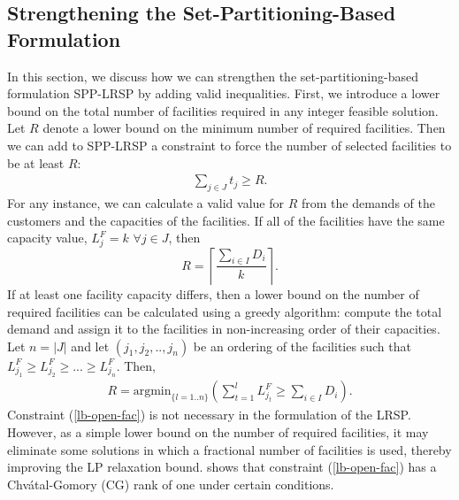 \documentclass[11pt]{article}
\begin{document}
\subsection{Strengthening the Set-Partitioning-Based Formulation}
\label{sec:StrongForm}
In this section, we discuss how we can strengthen the set-partitioning-based formulation
SPP-LRSP by adding valid inequalities. First, we introduce a lower bound on the total 
number of facilities required in any integer feasible solution.  Let $R$ denote a lower bound
on the minimum number of required facilities. 
Then we can add to SPP-LRSP a constraint to force the number of selected
facilities to be at least $R$:
\begin{eqnarray}
\sum_{j \in J} t_{j} \geq R. \label{lb-open-fac}
\end{eqnarray}
For any instance, we can calculate a valid value for $R$ from the demands of the customers and
the capacities of the facilities.  If all of the facilities have the same capacity value,
$L^F_j = k$ $\forall j \in J$, then 
\begin{equation}
R =\left \lceil \frac{\sum_{i \in I} D_i}{k} \right \rceil . \nonumber
\end{equation}
If at least one facility capacity differs, then a lower bound on the number of required
facilities can be calculated using a greedy algorithm: compute the total demand and assign
it to the facilities in non-increasing order of their capacities.  Let $n = |J|$ and 
let $(j_1,j_2,..,j_n)$ be an ordering of the facilities such that 
$L^F_{j_1}\geq L^F_{j_2} \geq ...\geq L^F_{j_n}$. Then,
\begin{eqnarray}
 R = \mbox{argmin}_{\{l = 1..n\}} \left (\sum_{t=1}^{l}L^F_{j_t}\geq \sum_{i \in I} D_i \right ).  
\end{eqnarray}
Constraint (\ref{lb-open-fac}) is not necessary in the formulation of the LRSP. However, as a simple
lower bound on the number of required facilities, it may eliminate some solutions in which 
a fractional number of facilities is used, thereby improving the LP relaxation bound.
\cite{Akca} shows that constraint (\ref{lb-open-fac}) has a Chv\'atal-Gomory (CG) rank
of one under certain conditions.
\end{document}
